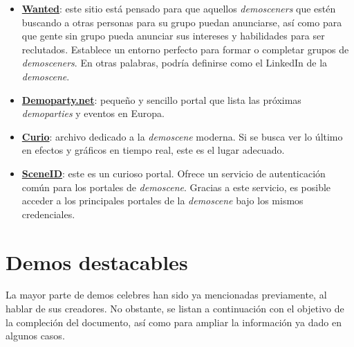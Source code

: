 \begin{itemize}
	\item \textbf{\href{http://wanted.scene.org}{Wanted}}: este sitio está pensado para que aquellos \emph{demosceners} que estén buscando a otras personas para su grupo puedan anunciarse, así como para que gente sin grupo pueda anunciar sus intereses y habilidades para ser reclutados. Establece un entorno perfecto para formar o completar grupos de \emph{demosceners}. En otras palabras, podría definirse como el LinkedIn de la \emph{demoscene}.
	\item \textbf{\href{https://www.demoparty.net}{Demoparty.net}}: pequeño y sencillo portal que lista las próximas \emph{demoparties} y eventos en Europa.
	\item \textbf{\href{http://curio.scene.org}{Curio}}: archivo dedicado a la \emph{demoscene} moderna. Si se busca ver lo último en efectos y gráficos en tiempo real, este es el lugar adecuado.
	\item \textbf{\href{https://id.scene.org}{SceneID}}: este es un curioso portal. Ofrece un servicio de autenticación común para los portales de \emph{demoscene}. Gracias a este servicio, es posible acceder a los principales portales de la \emph{demoscene} bajo los mismos credenciales.
\end{itemize}

\section{Demos destacables}

La mayor parte de demos celebres han sido ya mencionadas previamente, al hablar de sus creadores. No obstante, se listan a continuación con el objetivo de la compleción del documento, así como para ampliar la información ya dado en algunos casos.

